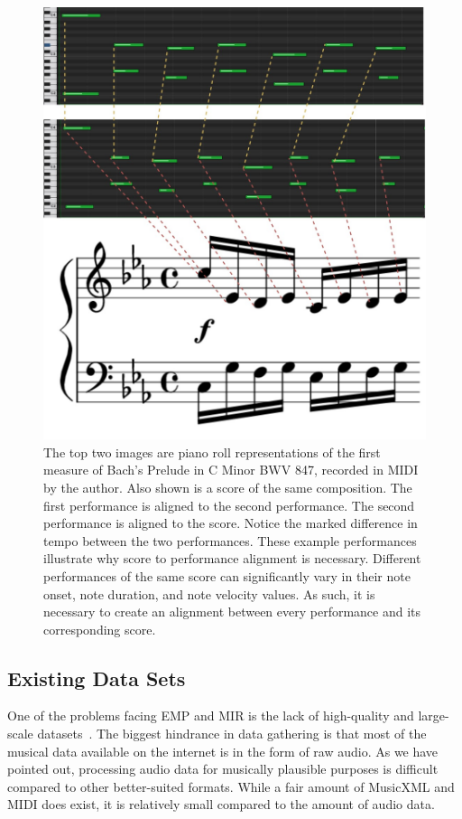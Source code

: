 \begin{figure}
    \centering
    \includegraphics[width=0.85\linewidth]{figs/ch2/score_2_perf_alignment.jpg}
    \caption{The top two images are piano roll representations of the first measure of Bach's Prelude in C Minor BWV 847, recorded in MIDI by the author. Also shown is a score of the same composition. The first performance is aligned to the second performance. The second performance is aligned to the score. Notice the marked difference in tempo between the two performances. These example performances illustrate why score to performance alignment is necessary. Different performances of the same score can significantly vary in their note onset, note duration, and note velocity values. As such, it is necessary to create an alignment between every performance and its corresponding score.}
    \label{fig:alignment}
\end{figure}

\subsection{Existing Data Sets}
One of the problems facing EMP and MIR is the lack of high-quality and large-scale datasets~\cite{cancino2018computational}. The biggest hindrance in data gathering is that most of the musical data available on the internet is in the form of raw audio. As we have pointed out, processing audio data for musically plausible purposes is difficult compared to other better-suited formats. While a fair amount of MusicXML and MIDI does exist, it is relatively small compared to the amount of audio data. 


